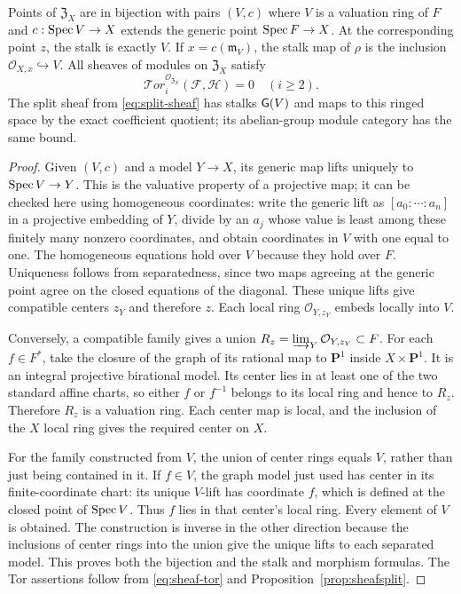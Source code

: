 \begin{theorem}
\label{thm:valuationrefinement}
Points of $\mathfrak Z_X$ are in bijection with pairs $(V,c)$ where $V$
is a valuation ring of $F$ and $c:\operatorname{Spec} V\to X$ extends the generic
point $\operatorname{Spec} F\to X$. At the corresponding point $z$, the stalk is
exactly $V$. If $x=c(\mathfrak m_V)$, the stalk map of $\rho$ is the
inclusion $\mathcal O_{X,x}\hookrightarrow V$. All sheaves of modules
on $\mathfrak Z_X$ satisfy
\[
 \mathcal{T}or_i^{\mathcal O_{\mathfrak Z_X}}(\mathcal F,\mathcal H)=0
 \quad(i\ge2).
 \tag{AV7.3}\label{eq:refinement-tor}
\]
The split sheaf from \eqref{eq:split-sheaf} has stalks $\mathsf G(V)$ and
maps to this ringed space by the exact coefficient quotient; its
abelian-group module category has the same bound.
\end{theorem}
\begin{proof}
Given $(V,c)$ and a model $Y\to X$, its generic map lifts uniquely to
$\operatorname{Spec} V\to Y$. This is the valuative property of a projective map;
it can be checked here using homogeneous coordinates: write the
generic lift as $[a_0:\cdots:a_n]$ in a projective embedding of $Y$,
divide by an $a_j$ whose value is least among these finitely many
nonzero coordinates, and obtain coordinates in $V$ with one equal to
one. The homogeneous equations hold over $V$ because they hold over
$F$. Uniqueness follows from separatedness, since two maps agreeing
at the generic point agree on the closed equations of the diagonal.
These unique lifts give compatible centers $z_Y$ and therefore $z$.
Each local ring $\mathcal O_{Y,z_Y}$ embeds locally into $V$.

Conversely, a compatible family gives a union
$R_z=\varinjlim_Y\mathcal O_{Y,z_Y}\subset F$. For each $f\in F^*$,
take the closure of the graph of its rational map to $\mathbf P^1$
inside $X\times\mathbf P^1$. It is an integral projective birational
model. Its center lies in at least one of the two standard affine
charts, so either $f$ or $f^{-1}$ belongs to its local ring and hence
to $R_z$. Therefore $R_z$ is a valuation ring. Each center map is local,
and the inclusion of the $X$ local ring gives the required center on $X$.

For the family constructed from $V$, the union of center rings equals
$V$, rather than just being contained in it. If $f\in V$, the graph
model just used has center in its finite-coordinate chart: its unique
$V$-lift has coordinate $f$, which is defined at the closed point of
$\operatorname{Spec} V$. Thus $f$ lies in that center's local ring. Every element
of $V$ is obtained. The construction is inverse in the other direction
because the inclusions of center rings into the union give the unique
lifts to each separated model. This proves both the bijection and the
stalk and morphism formulas. The Tor assertions follow from
\eqref{eq:sheaf-tor} and Proposition~\ref{prop:sheafsplit}.
\end{proof}


